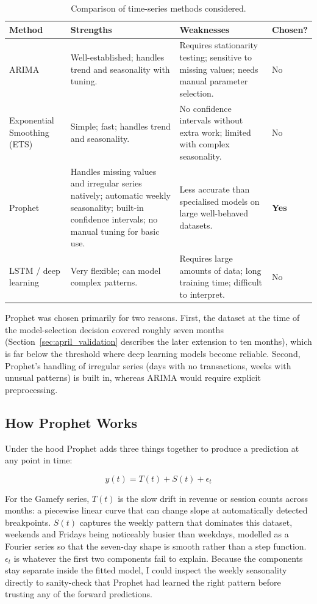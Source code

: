 \documentclass[12pt, a4paper]{report}
\begin{document}
\begin{table}[H]
  \centering
  \caption{Comparison of time-series methods considered.\label{tab:method_compare}}
  \begin{tabular}{p{2.5cm} p{4cm} p{4cm} p{2cm}}
    \toprule
    \textbf{Method} & \textbf{Strengths} & \textbf{Weaknesses} & \textbf{Chosen?} \\
    \midrule
    ARIMA
      & Well-established; handles trend and seasonality with tuning.
      & Requires stationarity testing; sensitive to missing values; needs manual
        parameter selection.
      & No \\[4pt]
    Exponential Smoothing (ETS)
      & Simple; fast; handles trend and seasonality.
      & No confidence intervals without extra work; limited with complex seasonality.
      & No \\[4pt]
    Prophet
      & Handles missing values and irregular series natively; automatic weekly
        seasonality; built-in confidence intervals; no manual tuning for basic use.
      & Less accurate than specialised models on large well-behaved datasets.
      & \textbf{Yes} \\[4pt]
    LSTM / deep learning
      & Very flexible; can model complex patterns.
      & Requires large amounts of data; long training time; difficult to interpret.
      & No \\
    \bottomrule
  \end{tabular}
\end{table}

Prophet was chosen primarily for two reasons. First, the dataset at the time of
the model-selection decision covered roughly seven months
(Section~\ref{sec:april_validation} describes the later extension to ten months),
which is far below the threshold where deep learning models become reliable.
Second, Prophet's handling of irregular series (days with no transactions, weeks
with unusual patterns) is built in, whereas ARIMA would require explicit
preprocessing.

\subsection{How Prophet Works}

Under the hood Prophet adds three things together to produce a prediction at any
point in time:

\[
  y(t) = T(t) + S(t) + \epsilon_t
\]

For the Gamefy series, $T(t)$ is the slow drift in revenue or session counts
across months: a piecewise linear curve that can change slope at automatically
detected breakpoints. $S(t)$ captures the weekly pattern that dominates this
dataset, weekends and Fridays being noticeably busier than weekdays, modelled as
a Fourier series so that the seven-day shape is smooth rather than a step
function. $\epsilon_t$ is whatever the first two components fail to explain.
Because the components stay separate inside the fitted model, I could inspect
the weekly seasonality directly to sanity-check that Prophet had learned the
right pattern before trusting any of the forward predictions.
\end{document}
